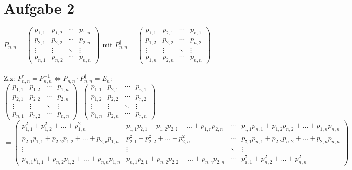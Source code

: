 \documentclass[a4paper]{scrartcl}
\begin{document}
\section*{Aufgabe 2}
$P_{n,n} = 
 \begin{pmatrix}
  p_{1,1} & p_{1,2} & \cdots & p_{1,n} \\
  p_{2,1} & p_{2,2} & \cdots & p_{2,n} \\
  \vdots  & \vdots  & \ddots & \vdots  \\
  p_{n,1} & p_{n,2} & \cdots & p_{n,n} 
 \end{pmatrix}$ mit $
P_{n,n}^{\dagger} = 
 \begin{pmatrix}
  p_{1,1} & p_{2,1} & \cdots & p_{n,1} \\
  p_{1,2} & p_{2,2} & \cdots & p_{n,2} \\
  \vdots  & \vdots  & \ddots & \vdots  \\
  p_{1,n} & p_{2,n} & \cdots & p_{n,n} 
\end{pmatrix}$\\\\
Z.z: $P_{n,n}^{\dagger} = P_{n,n}^{-1} \Leftrightarrow P_{n,n} \cdot P_{n,n}^{\dagger} = E_n$:\\
$\begin{pmatrix}
p_{1,1} & p_{1,2} & \cdots & p_{1,n} \\
p_{2,1} & p_{2,2} & \cdots & p_{2,n} \\
\vdots  & \vdots  & \ddots & \vdots  \\
p_{n,1} & p_{n,2} & \cdots & p_{n,n} 
\end{pmatrix} \cdot
\begin{pmatrix}
p_{1,1} & p_{2,1} & \cdots & p_{n,1} \\
p_{1,2} & p_{2,2} & \cdots & p_{n,2} \\
\vdots  & \vdots  & \ddots & \vdots  \\
p_{1,n} & p_{2,n} & \cdots & p_{n,n} 
\end{pmatrix}$\\
$ =
\begin{pmatrix}
p_{1,1}^2+p_{1,2}^2+...+p_{1,n}^2 & p_{1,1}p_{2,1}+p_{1,2}p_{2,2}+...+p_{1,n}p_{2,n} & \cdots & p_{1,1}p_{n,1}+p_{1,2}p_{n,2}+...+p_{1,n}p_{n,n} \\
p_{2,1}p_{1,1}+p_{2,2}p_{1,2}+...+p_{2,n}p_{1,n} & p_{2,1}^2+p_{2,2}^2+...+p_{2,n}^2 & \cdots & p_{2,1}p_{n,1}+p_{2,2}p_{n,2}+...+p_{2,n}p_{n,n} \\
\vdots  & \vdots  & \ddots & \vdots  \\
p_{n,1}p_{1,1}+p_{n,2}p_{1,2}+...+p_{n,n}p_{1,n} & p_{n,1}p_{2,1}+p_{n,2}p_{2,2}+...+p_{n,n}p_{2,n} & \cdots & p_{n,1}^2+p_{n,2}^2+...+p_{n,n}^2 
\end{pmatrix}$\\\\
\end{document}

